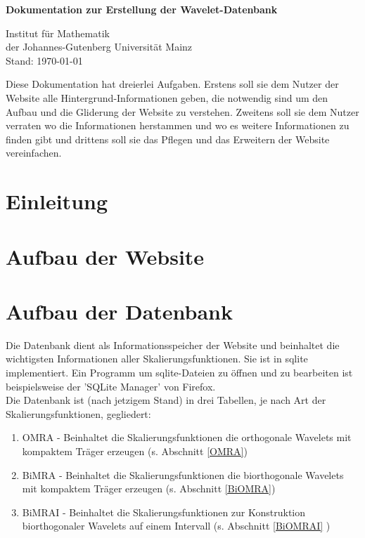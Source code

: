 \documentclass[11pt,a4paper,titlepage]{article}
\theoremstyle{plain} %
\theoremstyle{definition} %
\numberwithin{equation}{section} %
\begin{document}
	\noindent
	\parindent0pt %
	\begin{center}
  		\huge{\textbf{Dokumentation zur Erstellung der Wavelet-Datenbank }} \\
 	
    
    	\vspace{2cm}
 

		\large{Institut für Mathematik \\
	 	der Johannes-Gutenberg Universität Mainz\\
	 	Stand: \today }

		\vspace*{2cm}
		
		Diese Dokumentation hat dreierlei Aufgaben. Erstens soll sie dem Nutzer der Website alle Hintergrund-Informationen geben, die notwendig sind um den Aufbau und die Gliderung der Website zu verstehen. Zweitens soll sie dem Nutzer verraten wo die Informationen herstammen und wo es weitere Informationen zu finden gibt und drittens soll sie das Pflegen und das Erweitern der Website vereinfachen.
	\end{center}

	\vspace*{2cm}
	\tableofcontents %
	\newpage


	\section{Einleitung}
	
	\section{Aufbau der Website}
	
	\section{Aufbau der Datenbank}
	
	Die Datenbank dient als Informationsspeicher der Website und beinhaltet die wichtigsten Informationen aller Skalierungsfunktionen. Sie ist in sqlite implementiert. Ein Programm um sqlite-Dateien zu öffnen und zu bearbeiten ist beispielsweise der 'SQLite Manager' von Firefox.\\
	Die Datenbank ist (nach jetzigem Stand) in drei Tabellen, je nach Art der Skalierungsfunktionen, gegliedert:\\
	
	\begin{enumerate}
		\item OMRA - Beinhaltet die Skalierungsfunktionen die orthogonale Wavelets mit kompaktem Träger erzeugen (s. Abschnitt \ref{OMRA})
		\item BiMRA - Beinhaltet die Skalierungsfunktionen die biorthogonale Wavelets mit kompaktem Träger erzeugen (s. Abschnitt \ref{BiOMRA})
		\item BiMRAI - Beinhaltet die Skalierungsfunktionen zur Konstruktion biorthogonaler Wavelets auf einem Intervall (s. Abschnitt \ref{BiOMRAI} )
	\end{enumerate} 
	
\end{document}
